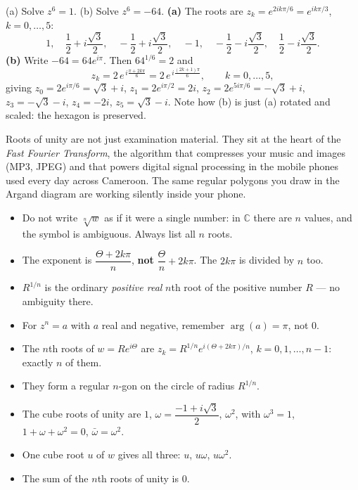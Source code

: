 \documentclass[11pt]{article}
\begin{document}
\begin{exoresolu}[Solving $z^6 = 1$ and $z^6 = -64$]
(a) Solve $z^6 = 1$. \quad (b) Solve $z^6 = -64$.
\tcblower
\textbf{(a)} The roots are $z_k = e^{2ik\pi/6} = e^{ik\pi/3}$, $k = 0, \dots, 5$:
\[ 1,\quad \frac{1}{2} + i\frac{\sqrt{3}}{2},\quad -\frac{1}{2} + i\frac{\sqrt{3}}{2},\quad -1,\quad -\frac{1}{2} - i\frac{\sqrt{3}}{2},\quad \frac{1}{2} - i\frac{\sqrt{3}}{2}. \]
\textbf{(b)} Write $-64 = 64 e^{i\pi}$. Then $64^{1/6} = 2$ and
\[ z_k = 2\, e^{\,i\frac{\pi + 2k\pi}{6}} = 2\, e^{\,i\frac{(2k+1)\pi}{6}}, \qquad k = 0, \dots, 5, \]
giving $z_0 = 2e^{i\pi/6} = \sqrt{3} + i$, $z_1 = 2e^{i\pi/2} = 2i$, $z_2 = 2e^{5i\pi/6} = -\sqrt{3} + i$, $z_3 = -\sqrt{3} - i$, $z_4 = -2i$, $z_5 = \sqrt{3} - i$. Note how (b) is just (a) rotated and scaled: the hexagon is preserved.
\end{exoresolu}

\begin{savaistu}
Roots of unity are not just examination material. They sit at the heart of the \emph{Fast Fourier Transform}, the algorithm that compresses your music and images (MP3, JPEG) and that powers digital signal processing in the mobile phones used every day across Cameroon. The same regular polygons you draw in the Argand diagram are working silently inside your phone.
\end{savaistu}

\begin{attention}
\begin{itemize}
\item Do not write $\sqrt[n]{w}$ as if it were a single number: in $\mathbb{C}$ there are $n$ values, and the symbol is ambiguous. Always list all $n$ roots.
\item The exponent is $\dfrac{\Theta + 2k\pi}{n}$, \textbf{not} $\dfrac{\Theta}{n} + 2k\pi$. The $2k\pi$ is divided by $n$ too.
\item $R^{1/n}$ is the ordinary \emph{positive real} $n$th root of the positive number $R$ — no ambiguity there.
\item For $z^n = a$ with $a$ real and negative, remember $\arg(a) = \pi$, not $0$.
\end{itemize}
\end{attention}

\begin{aretenir}
\begin{itemize}
\item The $n$th roots of $w = Re^{i\Theta}$ are $z_k = R^{1/n} e^{i(\Theta + 2k\pi)/n}$, $k = 0, 1, \dots, n-1$: exactly $n$ of them.
\item They form a regular $n$-gon on the circle of radius $R^{1/n}$.
\item The cube roots of unity are $1$, $\omega = \dfrac{-1+i\sqrt{3}}{2}$, $\omega^2$, with $\omega^3 = 1$, $1 + \omega + \omega^2 = 0$, $\bar\omega = \omega^2$.
\item One cube root $u$ of $w$ gives all three: $u$, $u\omega$, $u\omega^2$.
\item The sum of the $n$th roots of unity is $0$.
\end{itemize}
\end{aretenir}
\end{document}
